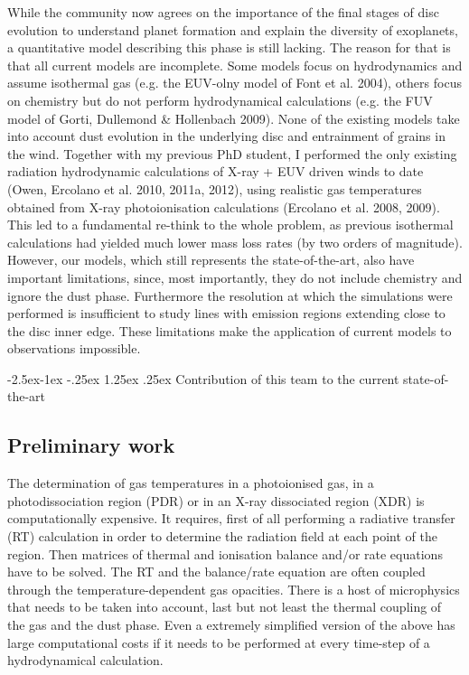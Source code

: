 \documentclass[10pt,fleqn,twoside]{article}
\makeatletter
\renewcommand\paragraph{\@startsection{paragraph}{4}{\z@}%
            {-2.5ex\@plus -1ex \@minus -.25ex}%
            {1.25ex \@plus .25ex}%
            {\normalfont\normalsize\bfseries}}
\makeatother
\begin{document}
While the community now agrees on the importance of the final stages
of disc evolution to understand planet formation and explain the
diversity of exoplanets, a quantitative model describing this phase is
still lacking. The reason for that is that all current models are
incomplete. Some models focus on hydrodynamics and 
assume isothermal gas (e.g. the EUV-olny model of Font et al. 2004), others focus on
chemistry but do not perform hydrodynamical calculations (e.g. the FUV
model of Gorti,
Dullemond \& Hollenbach 2009). None of the existing models take into
account dust evolution in the underlying disc and entrainment of
grains in the wind. Together with my previous PhD student, I performed
the only existing radiation hydrodynamic calculations of X-ray  + EUV driven
winds to date (Owen, Ercolano et al. 2010, 2011a, 2012), using realistic gas
temperatures obtained from X-ray photoionisation calculations
(Ercolano et al. 2008, 2009). This led to a fundamental re-think to the
whole problem, as previous isothermal calculations had yielded much
lower mass loss rates (by two orders of magnitude). However, our
models, which still represents the state-of-the-art, also have
important limitations, since, most importantly, they do not include
chemistry and ignore the dust phase. Furthermore the resolution at
which the simulations were performed is insufficient to study lines with
emission regions extending close to the disc inner edge. These
limitations make the application of current models to observations
impossible.  

\paragraph{Contribution of this team to the current state-of-the-art}

\subsection{Preliminary work}

The determination of gas temperatures in a photoionised gas, in a
photodissociation region (PDR) or in an X-ray dissociated region (XDR)
is computationally expensive. It requires, first of all 
performing a radiative transfer (RT) calculation in order to determine the
radiation field at each point of the region. Then matrices of thermal and
ionisation balance and/or rate equations have to be solved. The RT and
the balance/rate equation are often coupled through the
temperature-dependent gas opacities. There is a host of microphysics
that needs to be taken into account, last but not least the thermal
coupling of the gas and the dust phase. Even a extremely simplified
version of the above has large computational costs if it needs to be performed at
every time-step of a hydrodynamical calculation. 
\end{document}
